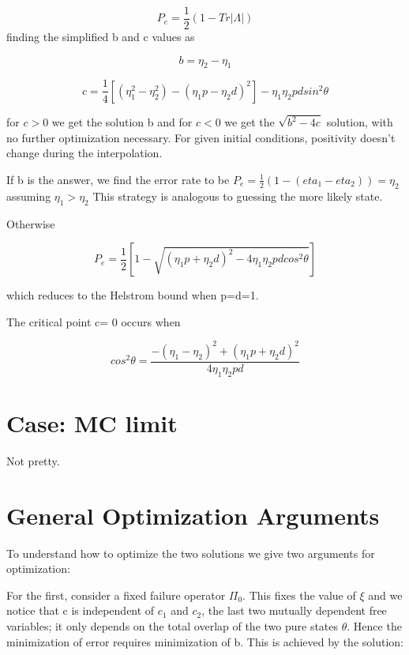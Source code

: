 \documentclass[12pt,oneside,english,reqno]{amsbook}
\numberwithin{section}{chapter}
\numberwithin{equation}{section}
\numberwithin{figure}{section}
\newcommand{\abs}[1]{\left|{#1}\right|}
\begin{document}
\[ P_e = \frac{1}{2}(1- Tr \abs \Lambda)\]
finding the simplified b and c values as

\[ b = \eta_2 - \eta_1\]

\[ c = \frac{1}{4}[ (\eta_1 ^2 - \eta_2^2) - (\eta_1 p - \eta_2 d)^2] - \eta_1 \eta_2 p d sin^2 \theta\]

for $c>0$ we get the solution b and for $c<0$ we get the $\sqrt{b^2-4c}$ solution, with no further optimization necessary.  For given initial conditions, positivity doesn't change during the interpolation.

If b is the answer, we find the error rate to be $P_e = \frac{1}{2} (1- (eta_1-eta_2)) = \eta_2$ assuming $\eta_1 >\eta_2$  This strategy is analogous to guessing the more likely state.

Otherwise

\[P_e = \frac{1}{2}[ 1 - \sqrt{(\eta_1 p +\eta_2 d)^2 - 4\eta_1 \eta_2 p d cos ^2 \theta}]\]

which reduces to the Helstrom bound when p=d=1.

The critical point c= 0 occurs when 

\[ cos^2 \theta = \frac{- (\eta_1 - \eta_2)^2  + (\eta_1 p +\eta_2 d)^2}{4\eta_1 \eta_2 p d}\] 




\section{Case: MC limit}
Not pretty.


\section{General Optimization Arguments}
To understand how to optimize the two solutions we give two arguments for optimization:

For the first, consider a fixed failure operator $\Pi_0$. This fixes the value of $\xi$ and we notice that c is independent of $c_1$ and $c_2$, the last two mutually dependent free variables; it only depends on the total overlap of the two pure states $\theta$.  Hence the minimization of error requires minimization of b.  This is achieved by the solution:
\end{document}
